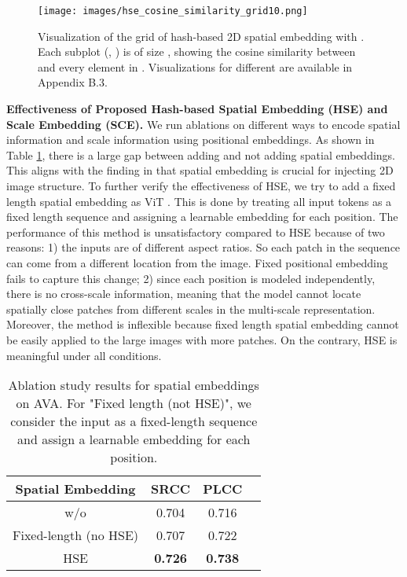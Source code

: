 \begin{figure}[!tp]
\centering
\texttt{[image: images/hse\_cosine\_similarity\_grid10.png]}\vspace{-0.5mm}
\caption{Visualization of the grid of hash-based 2D spatial embedding with . Each subplot (, ) is of size , showing the cosine similarity between  and every element in . Visualizations for different  are available in Appendix B.3.  }\vspace{-3mm}
\label{fig:hse_cosine_similarity_grid10} 
\end{figure}

\vspace{+1.5mm}
\noindent\textbf{Effectiveness of Proposed Hash-based Spatial Embedding (HSE) and Scale Embedding (SCE).} We run ablations on different ways to encode spatial information and scale information using positional embeddings. As shown in Table \ref{tab:spatial-emb}, there is a large gap between adding and not adding spatial embeddings. This aligns with the finding in \cite{dosovitskiy2020} that spatial embedding is crucial for injecting 2D image structure. To further verify the effectiveness of HSE, we try to add a fixed length spatial embedding as ViT \cite{dosovitskiy2020}. This is done by treating all input tokens as a fixed length sequence and assigning a learnable embedding for each position. The performance of this method is unsatisfactory compared to HSE because of two reasons: 1) the inputs are of different aspect ratios. So each patch in the sequence can come from a different location from the image. Fixed positional embedding fails to capture this change; 2) since each position is modeled independently, there is no cross-scale information, meaning that the model cannot locate spatially close patches from different scales in the multi-scale representation. Moreover, the method is inflexible because fixed length spatial embedding cannot be easily applied to the large images with more patches. On the contrary, HSE is meaningful under all conditions.


\begin{table}[!tp]
\footnotesize
\begin{center}
\begin{tabular}{cccc}\toprule
Spatial Embedding &SRCC &PLCC \\\midrule
w/o &0.704 &0.716 \\
Fixed-length (no HSE) &0.707 &0.722 \\
HSE &\textbf{0.726} &\textbf{0.738} \\
\bottomrule
\end{tabular}
\end{center}
\vspace{-2mm}
\caption{Ablation study results for spatial embeddings on AVA. For "Fixed length (not HSE)", we consider the input as a fixed-length sequence and assign a learnable embedding for each position.}\label{tab:spatial-emb}
\vspace{-1mm}
\end{table}

